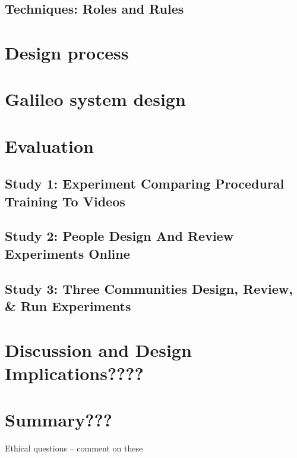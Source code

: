 \subsection{Techniques: Roles and Rules}

\section{Design process}

\section{Galileo system design}

\section{Evaluation}
\subsection{Study 1: Experiment Comparing Procedural Training To Videos}
\subsection{Study 2: People Design And Review Experiments Online}
\subsection{Study 3: Three Communities Design, Review, \& Run Experiments}

\section{Discussion and Design Implications????}
\section{Summary???}


Ethical questions -- comment on these

